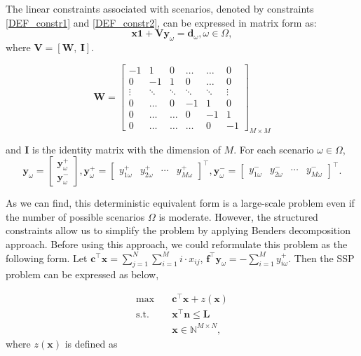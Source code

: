 The linear constraints associated with scenarios, denoted by constraints \eqref{DEF_constr1} and \eqref{DEF_constr2}, can be expressed in matrix form as:
\[\mathbf{x} \mathbf{1} + \mathbf{V} \mathbf{y}_\omega = \mathbf{d}_\omega, \omega\in \Omega,\]
where $\mathbf{V} = [\mathbf{W}, ~\mathbf{I}]$.

$$
\mathbf{W}=\left[\begin{array}{cccccc}
-1 & 1 & 0 & \ldots & \ldots & 0 \\
0 & -1 & 1 &    0   & \ldots & 0 \\
\vdots & \ddots & \ddots & \ddots & \ddots & \vdots \\
0  & \ldots   &  0  & -1 & 1 & 0 \\
0  & \ldots   &  \ldots  &  0 &  -1 & 1 \\
0 & \ldots & \ldots & \ldots & 0 & -1
\end{array}\right]_{M \times M}
$$

and $\mathbf{I}$ is the identity matrix with the dimension of $M$. For each scenario $\omega \in \Omega$,
$$
\mathbf{y}_{\omega}=\left[\begin{array}{l}
\mathbf{y}_{\omega}^{+} \\
\mathbf{y}_{\omega}^{-}
\end{array}\right], \mathbf{y}_{\omega}^{+}=\left[\begin{array}{lllll}y_{1 \omega}^{+} & y_{2 \omega}^{+} & \cdots & y_{M \omega}^{+}\end{array}\right]^{\intercal}, \mathbf{y}_{\omega}^{-}=\left[\begin{array}{llll}y_{1 \omega}^{-} & y_{2 \omega}^{-} & \cdots & y_{M \omega}^{-}\end{array}\right]^{\intercal}.
$$

As we can find, this deterministic equivalent form is a large-scale problem even if the number of possible scenarios $\Omega$ is moderate. However, the structured constraints allow us to simplify the problem by applying Benders decomposition approach. Before using this approach, we could reformulate this problem as the following form. Let $\mathbf{c}^{\intercal}\mathbf{x} = \sum_{j =1}^{N} \sum_{i=1}^M i \cdot x_{ij}$, $\mathbf{f}^{\intercal}\mathbf{y}_{\omega} = -\sum_{i=1}^{M} y_{i \omega}^{+}$. Then the SSP problem can be expressed as below,

\begin{equation}\label{BD_master}
\begin{aligned}
\max \quad & \mathbf{c}^{\intercal} \mathbf{x}+ z(\mathbf{x}) \\
\text {s.t.} \quad & \mathbf{x}^{\intercal} \mathbf{n}  \leq \mathbf{L} \\
& \mathbf{x} \in \mathbb{N}^{M \times N},
\end{aligned}
\end{equation}
where $z(\mathbf{x})$ is defined as

